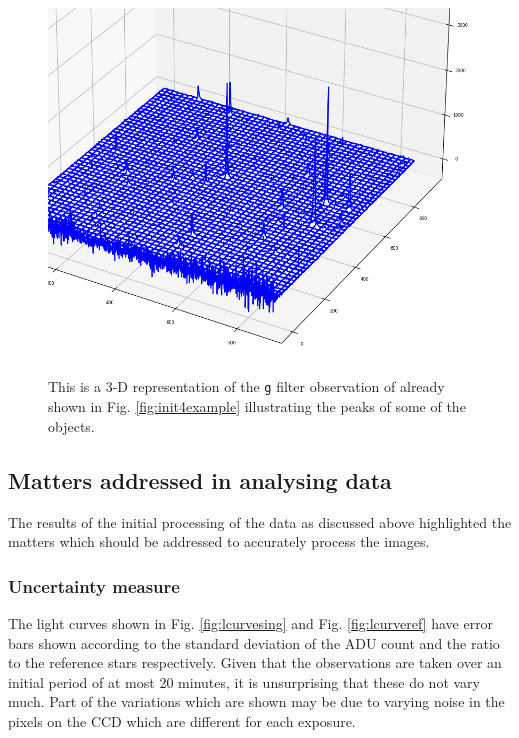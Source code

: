\begin{figure}[!htbp]
\begin{center}
\includegraphics[scale=0.5]{images/im3d.png}
\end{center}
\caption{This is a 3-D representation of the \texttt{g} filter observation of
{\prox} already shown in Fig. \ref{fig:init4example} illustrating the peaks of
some of the objects.} \protect\label{fig:im3d}
\end{figure}

\clearpage

\subsection{Matters addressed in analysing data}
\protect\label{section:mattersaddressed}

The results of the initial processing of the data as discussed above highlighted
the matters which should be addressed to accurately process the images.

\subsubsection{Uncertainty measure}
\protect\label{section:issueuncertainty}

The light curves shown in Fig. \ref{fig:lcurvesing} and Fig. \ref{fig:lcurveref}
have error bars shown according to the standard deviation of the ADU count and
the ratio to the reference stars respectively. Given that the observations are
taken over an initial period of at most 20 minutes, it is unsurprising that
these do not vary much. Part of the variations which are shown may be due to
varying noise in the pixels on the CCD which are different for each exposure.

